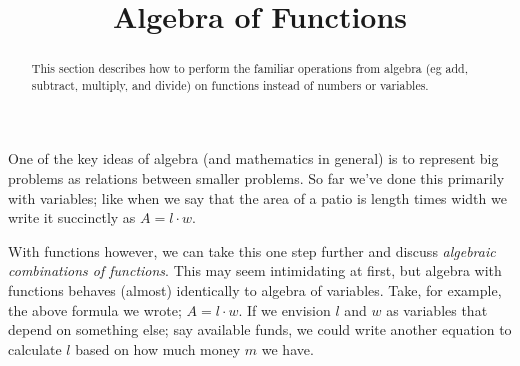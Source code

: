 \documentclass{ximeraXloud}
\title{Algebra of Functions}
\begin{document}
\begin{abstract}
    This section describes how to perform the familiar operations from algebra (eg add, subtract, multiply, and divide) on functions instead of numbers or variables.
\end{abstract}
\maketitle

One of the key ideas of algebra (and mathematics in general) is to represent big problems as relations between smaller problems. So far we've done this primarily with variables; like when we say that the area of a patio is length times width we write it succinctly as $A = l\cdot w$.

With functions however, we can take this one step further and discuss \textit{algebraic combinations of functions}. This may seem intimidating at first, but algebra with functions behaves (almost) identically to algebra of variables. Take, for example, the above formula we wrote; $A = l\cdot w$. If we envision $l$ and $w$ as variables that depend on something else; say available funds, we could write another equation to calculate $l$ based on how much money $m$ we have.
\end{document}
